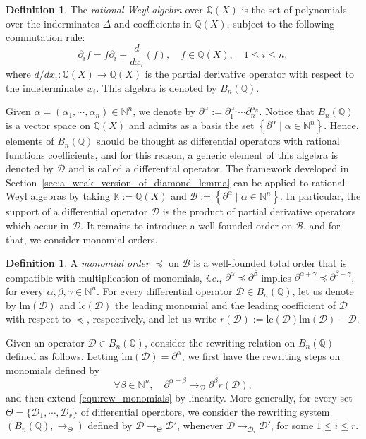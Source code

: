 \documentclass[10pt]{easychair}
\theoremstyle{definition}
\newtheorem{definition}[theorem]{Definition}
\newcommand\ie{\emph{i.e.}}
\newcommand\diff[1]{\partial_{#1}}
\newcommand\D{\mathcal{D}}
\newcommand\lm{\text{lm}}
\newcommand\lc{\text{lc}}
\newcommand\basis{\mathscr{B}}
\newcommand\K{\mathbb{K}}
\newcommand\Q{\mathbb{Q}}
\newcommand\N{\mathbb{N}}
\newcommand\Weyl{B_n(\Q)}
\newcommand\rewTheta{\to_{\Theta}}
\begin{document}
\begin{definition}
  The {\it rational Weyl algebra} over $\Q(X)$ is the set of polynomials
  over the inderminates $\Delta$ and coefficients in $\Q(X)$, subject to
  the following commutation rule:
  \[\diff{i}f=f\diff{i}+\frac{d}{dx_i}(f),\quad f\in\Q(X),\quad
  1\leq i\leq n,\]
  where $d/dx_i:\Q(X)\to\Q(X)$ is the partial derivative operator with
  respect to the indeterminate~$x_i$. This algebra is denoted by $\Weyl$.
\end{definition}

Given $\alpha=(\alpha_1,\cdots,\alpha_n)\in\N^n$, we denote by 
$\partial^{\alpha}:=\diff{1}^{\alpha_1}\cdots\diff{n}^{\alpha_n}$. Notice
that $\Weyl$ is a vector space on $\Q(X)$ and admits as a basis the set
$\left\{\partial^\alpha\mid\alpha\in\N^n\right\}$. Hence, elements of
$\Weyl$ should be thought as differential operators with rational
functions coefficients, and for this reason, a generic element of this
algebra is denoted by $\D$ and is called a differential operator. The
framework developed in Section~\ref{sec:a_weak_version_of_diamond_lemma}
can be applied to rational Weyl algebras by taking $\K:=\Q(X)$ and
$\basis:=\left\{\partial^\alpha\mid\alpha\in\N^n\right\}$. In particular,
the support of a differential operator $\D$ is the product of partial
derivative operators which occur in $\D$. It remains to introduce a
well-founded order on $\basis$, and for that, we consider monomial
orders.

\begin{definition}
  A {\em monomial order} $\preceq$ on $\basis$ is a well-founded total
  order that is compatible with multiplication of monomials, \ie,
  $\partial^{\alpha}\preceq\partial^{\beta}$ implies 
  $\partial^{\alpha+\gamma}\preceq\partial^{\beta+\gamma}$, for every
  $\alpha,\beta,\gamma\in\N^n$. For every differential operator
  $\D\in\Weyl$, let us denote by $\lm(\D)$ and $\lc(\D)$ the leading
  monomial and the leading coefficient of $\D$ with respect to $\preceq$,
  respectively, and let us write $r(\D):=\lc(\D)\lm(\D)-\D$. 
\end{definition}

Given an operator $\D\in\Weyl$, consider the rewriting relation on
$\Weyl$ defined as follows. Letting $\lm(\D)=\partial^{\alpha}$, we first
have the rewriting steps on monomials defined by
\begin{equation}\label{equ:rew_monomials}
  \forall\beta\in\N^n,\quad\partial^{\alpha+\beta}
  \to_{\D}\partial^{\beta}r(\D),\end{equation}
and then extend \eqref{equ:rew_monomials} by linearity. More generally,
for every set $\Theta=\{\D_1,\cdots,\D_r\}$ of differential operators, we
consider the rewriting system $(\Weyl,\rewTheta)$ defined by
$\D\rewTheta\D'$, whenever $\D\to_{\D_i}\D'$, for some $1\leq i\leq r$.
\end{document}
